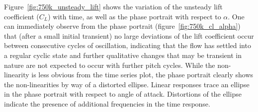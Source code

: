 Figure~\ref{fig:750k_unsteady_lift} shows the variation of the unsteady lift coefficient ($C_{L}$) with time, as well as the phase portrait with respect to $\alpha$. One can immediately observe from the phase portrait (figure~\ref{fig:750k_cl_alpha}) that (after a small initial transient) no large deviations of the lift coefficient occur between consecutive cycles of oscillation, indicating that the flow has settled into a regular cyclic state and further qualitative changes that may be transient in nature are not expected to occur with further pitch cycles. While the non-linearity is less obvious from the time series plot, the phase portrait clearly shows the non-linearities by way of a distorted ellipse. Linear responses trace an ellipse in the phase portrait with respect to angle of attack. Distortions of the ellipse indicate the presence of additional frequencies in the time response.

